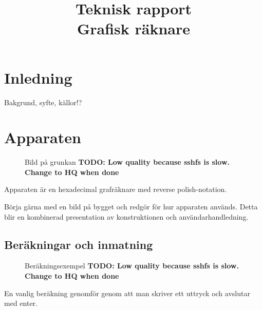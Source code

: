 \documentclass[]{article}
\title{Teknisk rapport\\Grafisk räknare}
\author{}
\begin{document}
\maketitle

\begin{abstract}
\end{abstract}
\section{Inledning}
Bakgrund, syfte, källor!?
\section{Apparaten}
\begin{figure}[h!]
	\caption{Bild på grunkan \textbf{TODO: Low quality because sshfs is slow. Change to HQ when done}}
\end{figure}
Apparaten är en hexadecimal grafräknare med reverse polish-notation.

Börja gärna med en bild på bygget och redgör för hur apparaten används. Detta blir en kombinerad presentation av konstruktionen och användarhandledning. 

\subsection{Beräkningar och inmatning}
\begin{figure}[h!]
	\caption{Beräkningsexempel \textbf{TODO: Low quality because sshfs is slow. Change to HQ when done}}
\end{figure}
En vanlig beräkning genomför genom att man skriver ett uttryck och avslutar med enter. 
\end{document}
